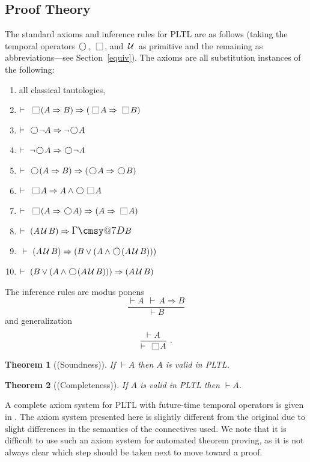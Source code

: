 \documentclass[nohyperref]{acmtrans2f}
\makeatletter
\def\sometime{\mathord{\hbox{\large$\mathchar"0\cmsy@7D$}}}
\newcommand{\always}{\raisebox{-.2ex}{
                           \mbox{\unitlength=0.9ex
                           \begin{picture}(2,2)
                           \linethickness{0.06ex}
                           \put(0,0){\line(1,0){2}}
                           \put(0,2){\line(1,0){2}}
                           \put(0,0){\line(0,1){2}}
                           \put(2,0){\line(0,1){2}}
                           \end{picture}}}
                          \,}
\newcommand{\next}{\!\raisebox{-.2ex}{ %
                        \mbox{\unitlength=0.9ex
                        \begin{picture}(2,2)
                        \linethickness{0.06ex}
                        \put(1,1){\circle{2}} %
                        \end{picture}}}       %
                        \,}
\def\until{\hbox{$\,\cal U \,$}}
\let\imp=\Rightarrow
\newtheorem{subtheorem}{Theorem}[subsection]
\let\prv=\vdash
\makeatother
\begin{document}
\subsection{Proof Theory}
%
The standard axioms and inference rules for PLTL are as follows (taking
the temporal operators $\next$, $\always$, and $\until$ as primitive and the
remaining as abbreviations---see Section~\ref{equiv}).
The axioms are all substitution instances of the following:
\begin{enumerate}
\item   all classical tautologies,
\item   $\prv\ \always (A \imp B ) \imp (  \always A \imp \always B)$
\item   $\prv\  \next \neg A \imp \neg \next A$
\item   $\prv\  \neg \next A \imp \next \neg A$
\item   $\prv\ \next (A \imp B) \imp (  \next A \imp \next B)$
\item   $\prv\ \always A \imp A \wedge \next \always A$    
\item   $\prv\ \always( A \imp \next A) \imp ( A \imp \always A)$
\item  $\prv\ (A \until B ) \imp \sometime B$
\item   $~\prv\ (A \until B ) \imp (B \vee ( A 
               \wedge \next (A \until B  )))$
\item   $\prv\  (B \vee ( A 
               \wedge \next (A \until B  )))\imp (A \until B )$
\end{enumerate}
%
The inference rules are modus ponens 
$$
\frac{\prv A\ \ \prv\,A \imp B }{\prv B}
$$
and 
generalization
$$
\frac{\prv A}{\prv\,\always A}\,\, .
$$
\begin{subtheorem}[(Soundness)\cite{GPSS80}]
If $\vdash A$ then $A$ is valid in PLTL.
\end{subtheorem}
\begin{subtheorem}[(Completeness)\cite{GPSS80}]
If $A$ is valid in PLTL then $\vdash A$.
\end{subtheorem}

A complete axiom system for PLTL with future-time temporal operators is
given in . The axiom system presented here is slightly
different from the original due to slight differences in the semantics of the
connectives used. We note that it is difficult to use such an axiom system for
automated theorem proving, as it is not always clear which step should be
taken next to move toward a proof.
\end{document}
